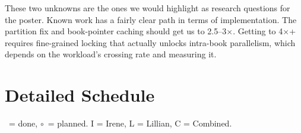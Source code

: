 \documentclass[11pt]{article}
\begin{document}
These two unknowns are the ones we would highlight as research questions for the poster. Known work has a fairly clear path in terms of implementation. The partition fix and book-pointer caching should get us to 2.5--3$\times$. Getting to 4$\times$+ requires fine-grained locking that actually unlocks intra-book parallelism, which depends on the workload's crossing rate and measuring it.


\section*{Detailed Schedule}

\noindent \checkmark\ = done, \quad $\circ$\ = planned. \quad I = Irene, L = Lillian, C = Combined.

\vspace{0.5em}

\setlength{\arrayrulewidth}{0.3pt}

\small
\setlength{\tabcolsep}{5pt}
\renewcommand{\arraystretch}{1.2}
\end{document}
